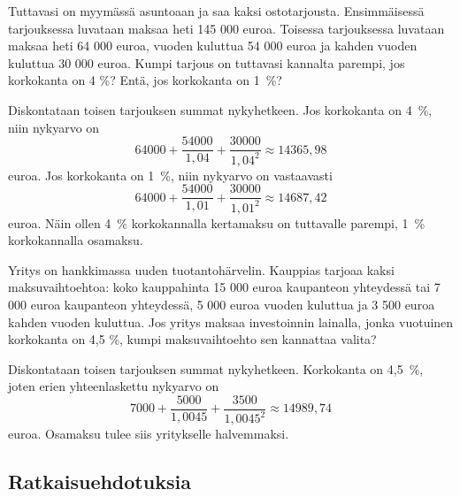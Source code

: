 \documentclass[a4paper,10pt]{article}\usepackage[]{graphicx}\usepackage[]{color}
\begin{document}
\begin{question} Tuttavasi on myymässä asuntoaan ja saa kaksi ostotarjousta. Ensimmäisessä tarjouksessa luvataan maksaa heti 145 000 euroa.
Toisessa tarjouksessa luvataan maksaa heti 64 000 euroa, vuoden kuluttua 54 000 euroa ja kahden vuoden kuluttua 30 000 euroa.
Kumpi tarjous on tuttavasi kannalta parempi, jos korkokanta on 4 \%? Entä, jos korkokanta on 1~\%?
\end{question}\begin{solution}
    Diskontataan toisen tarjouksen summat nykyhetkeen. Jos korkokanta on 4~\%, niin nykyarvo on
    \[
        64000 + \frac{54000}{1,04} + \frac{30000}{1,04^2} \approx 14365,98
    \] euroa.
    Jos korkokanta on 1~\%, niin nykyarvo on vastaavasti
    \[
        64000 + \frac{54000}{1,01} + \frac{30000}{1,01^2} \approx 14687,42
    \] euroa.
    Näin ollen 4~\% korkokannalla kertamaksu on tuttavalle parempi, 1~\% korkokannalla osamaksu.
\end{solution}

\begin{question} Yritys on hankkimassa uuden tuotantohärvelin. Kauppias tarjoaa kaksi maksuvaihtoehtoa:
koko kauppahinta 15 000 euroa kaupanteon yhteydessä tai 7 000 euroa kaupanteon yhteydessä,
5 000 euroa vuoden kuluttua ja 3 500 euroa kahden vuoden kuluttua. Jos yritys maksaa investoinnin lainalla,
jonka vuotuinen korkokanta on 4{,}5 \%, kumpi maksuvaihtoehto sen kannattaa valita?
\end{question}\begin{solution}
    Diskontataan toisen tarjouksen summat nykyhetkeen. Korkokanta on 4,5~\%, joten erien yhteenlaskettu nykyarvo on
    \[
        7000 + \frac{5000}{1,0045} + \frac{3500}{1,0045^2} \approx 14989,74
    \]
    euroa. Osamaksu tulee siis yritykselle halvemmaksi.
\end{solution}

\newpage
\subsection*{Ratkaisuehdotuksia}
\printsolutions
\end{document}
